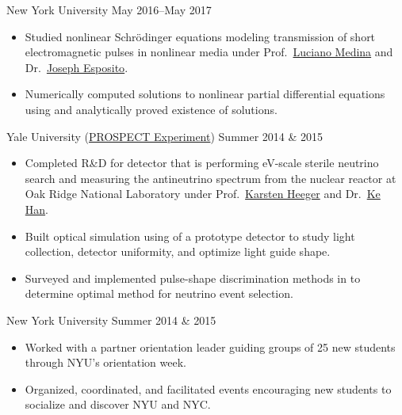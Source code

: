 \documentclass{cultvoucher}
\begin{document}
{New York University}
{May 2016--May 2017}
\begin{itemize}
	\vspace{-0.25em}
	\item Studied nonlinear Schr\"{o}dinger equations modeling transmission of
	      short electromagnetic pulses in nonlinear media under Prof.\
	      \href{https://www.sites.google.com/a/nyu.edu/luciano-medina/}{Luciano Medina}
	      and Dr.\ \href{https://cims.nyu.edu/~esposito/}{Joseph Esposito}.
	\item Numerically computed solutions to nonlinear partial differential
	      equations using \keyword{python} and analytically proved existence of
	      solutions.
\end{itemize}

{Yale University (\href{http://prospect.yale.edu/}{\small{PROSPECT Experiment}})}
{Summer 2014 \& 2015}
\begin{itemize}
	\vspace{-0.25em}
	\item Completed R\&D for detector that is performing eV-scale sterile
	      neutrino search and measuring the antineutrino spectrum from the
	      nuclear reactor at Oak Ridge National Laboratory under Prof.\
	      \href{http://heegerlab.yale.edu/karsten-heeger}{Karsten Heeger} and
	      Dr.\ \href{https://www.physics.sjtu.edu.cn/en/people/1/kehan}{Ke Han}.
	\item Built optical simulation using \keyword{C++} of a prototype detector
	      to study light collection, detector uniformity, and optimize light
	      guide shape.
	\item Surveyed and implemented pulse-shape discrimination methods in
	       to determine optimal method for neutrino event
	      selection.
\end{itemize}

{New York University}
{Summer 2014 \& 2015}
\begin{itemize}
	\vspace{-0.25em}
	\item Worked with a partner orientation leader guiding groups of 25 new
	      students through NYU's orientation week.
	\item Organized, coordinated, and facilitated events encouraging new
	      students to socialize and discover NYU and NYC.
\end{itemize}
\end{document}
